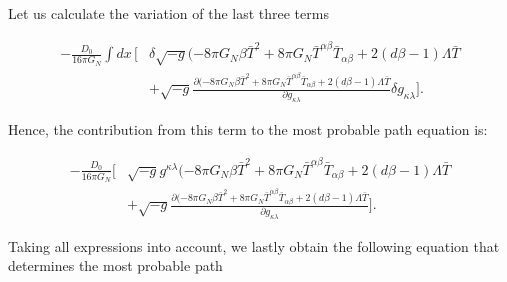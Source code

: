 \documentclass[aps,preprintnumbers,superscriptaddress,longbibliography]{revtex4-1}
\begin{document}
Let us calculate the variation of the last three terms

\begin{equation}
\begin{split}
-\frac{D_0}{16 \pi G_{N}}\int dx\, \bigg[&\delta \sqrt{-g}(-8 \pi G_{N}\beta\bar{T}^2+8 \pi G_{N}\bar{T}^{\alpha \beta}\bar{T}_{\alpha \beta}+2(d\beta-1)\Lambda\bar{T}\\
& +\sqrt{-g}\frac{\partial (-8 \pi G_{N}\beta\bar{T}^2+8 \pi G_{N}\bar{T}^{\alpha \beta}\bar{T}_{\alpha \beta}+2(d\beta-1)\Lambda\bar{T}}{\partial g_{\kappa \lambda}}\delta g_{\kappa \lambda}\bigg].
\end{split}
\end{equation}

Hence, the contribution from this term to the most probable path equation is:

\begin{equation}
\begin{split}
-\frac{D_0}{16 \pi G_{N}} \bigg[& \sqrt{-g}g^{\kappa \lambda}(-8 \pi G_{N}\beta\bar{T}^2+8 \pi G_{N}\bar{T}^{\alpha \beta}\bar{T}_{\alpha \beta}+2(d\beta-1)\Lambda\bar{T}\\
& +\sqrt{-g}\frac{\partial (-8 \pi G_{N}\beta\bar{T}^2+8 \pi G_{N}\bar{T}^{\alpha \beta}\bar{T}_{\alpha \beta}+2(d\beta-1)\Lambda\bar{T}}{\partial g_{\kappa \lambda}}\bigg].
\end{split}
\end{equation}

Taking all expressions into account, we lastly obtain the following equation that determines the most probable path 
\end{document}
